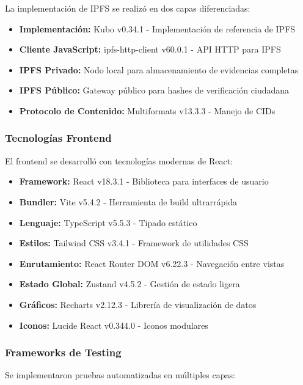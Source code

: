 La implementación de IPFS se realizó en dos capas diferenciadas:

\begin{itemize}
    \item \textbf{Implementación:} Kubo v0.34.1 - Implementación de referencia de IPFS
    \item \textbf{Cliente JavaScript:} ipfs-http-client v60.0.1 - API HTTP para IPFS
    \item \textbf{IPFS Privado:} Nodo local para almacenamiento de evidencias completas
    \item \textbf{IPFS Público:} Gateway público para hashes de verificación ciudadana
    \item \textbf{Protocolo de Contenido:} Multiformats v13.3.3 - Manejo de CIDs
\end{itemize}

\subsubsection{Tecnologías Frontend}

El frontend se desarrolló con tecnologías modernas de React:

\begin{itemize}
    \item \textbf{Framework:} React v18.3.1 - Biblioteca para interfaces de usuario
    \item \textbf{Bundler:} Vite v5.4.2 - Herramienta de build ultrarrápida
    \item \textbf{Lenguaje:} TypeScript v5.5.3 - Tipado estático
    \item \textbf{Estilos:} Tailwind CSS v3.4.1 - Framework de utilidades CSS
    \item \textbf{Enrutamiento:} React Router DOM v6.22.3 - Navegación entre vistas
    \item \textbf{Estado Global:} Zustand v4.5.2 - Gestión de estado ligera
    \item \textbf{Gráficos:} Recharts v2.12.3 - Librería de visualización de datos
    \item \textbf{Iconos:} Lucide React v0.344.0 - Iconos modulares
\end{itemize}

\subsubsection{Frameworks de Testing}

Se implementaron pruebas automatizadas en múltiples capas:


